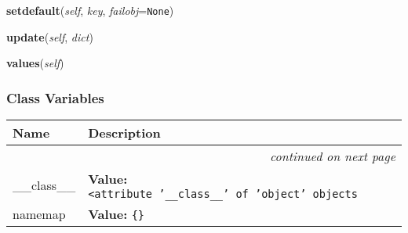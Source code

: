     \vspace{0.5ex}

    \begin{boxedminipage}{\textwidth}

    \raggedright \textbf{setdefault}(\textit{self}, \textit{key}, \textit{failobj}=\texttt{None})

    \end{boxedminipage}

    \label{DataDict:DataDict:update}

    \vspace{0.5ex}

    \begin{boxedminipage}{\textwidth}

    \raggedright \textbf{update}(\textit{self}, \textit{dict})

    \end{boxedminipage}

    \label{DataDict:DataDict:values}

    \vspace{0.5ex}

    \begin{boxedminipage}{\textwidth}

    \raggedright \textbf{values}(\textit{self})

    \end{boxedminipage}



  \subsubsection{Class Variables}

\begin{longtable}{|p{}|p{}|l}
\cline{1-2}
\cline{1-2} \centering \textbf{Name} & \centering \textbf{Description}& \\
\cline{1-2}
\endhead\cline{1-2}\multicolumn{3}{r}{\small\textit{continued on next page}}\\\endfoot\cline{1-2}
\endlastfoot\raggedright \_\-\_\-c\-l\-a\-s\-s\-\_\-\_\- & \textbf{Value:} 
{\tt {\textless}\-a\-t\-t\-r\-i\-b\-u\-t\-e\-~\-'\-\_\-\_\-c\-l\-a\-s\-s\-\_\-\_\-'\-~\-o\-f\-~\-'\-o\-b\-j\-e\-c\-t\-'\-~\-o\-b\-j\-e\-c\-t\-s\-{\textgreater}\-}&\\
\cline{1-2}
\raggedright n\-a\-m\-e\-m\-a\-p\- & \textbf{Value:} 
{\tt \{\-\}\-}&\\
\cline{1-2}
\end{longtable}

